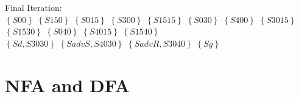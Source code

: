 \documentclass[11pt]{article}
\begin{document}
Final Iteration:\\
$\left\{
    {S00}
\right\}$
$\left\{
    {S150}
\right\}$
$\left\{
    {S015}
\right\}$
$\left\{
    {S300}
\right\}$
$\left\{
    {S1515}
\right\}$
$\left\{
    {S030}
\right\}$
$\left\{
    {S400}
\right\}$
$\left\{
    {S3015}
\right\}$
$\left\{
    {S1530}
\right\}$
$\left\{
    {S040}
\right\}$
$\left\{
    {S4015}
\right\}$
$\left\{
    {S1540}
\right\}$\\
$\left\{
    {Sd, S3030}
\right\}$
$\left\{
    {SadvS, S4030}
\right\}$
$\left\{
    {SadvR, S3040}
\right\}$
$\left\{
    {Sg}
\right\}$



\section{NFA and DFA}
\end{document}
